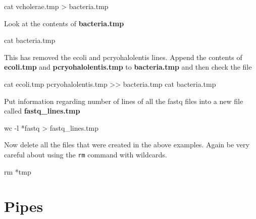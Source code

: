 \documentclass[
  letterpaper,
  DIV=11,
  numbers=noendperiod]{scrreprt}
\newenvironment{Shaded}{\begin{snugshade}}{\end{snugshade}}
\newcommand{\AttributeTok}[1]{\textcolor[rgb]{0.40,0.45,0.13}{#1}}
\newcommand{\FunctionTok}[1]{\textcolor[rgb]{0.28,0.35,0.67}{#1}}
\newcommand{\NormalTok}[1]{\textcolor[rgb]{0.00,0.23,0.31}{#1}}
\newcommand{\OperatorTok}[1]{\textcolor[rgb]{0.37,0.37,0.37}{#1}}
\newcommand{\PreprocessorTok}[1]{\textcolor[rgb]{0.68,0.00,0.00}{#1}}
\begin{document}
\begin{Shaded}
\begin{Highlighting}[]
\FunctionTok{cat}\NormalTok{ vcholerae.tmp }\OperatorTok{\textgreater{}}\NormalTok{ bacteria.tmp}
\end{Highlighting}
\end{Shaded}

Look at the contents of \textbf{bacteria.tmp}

\begin{Shaded}
\begin{Highlighting}[]
\FunctionTok{cat}\NormalTok{ bacteria.tmp}
\end{Highlighting}
\end{Shaded}

This has removed the ecoli and pcryohalolentis lines. Append the
contents of \textbf{ecoli.tmp} and \textbf{pcryohalolentis.tmp} to
\textbf{bacteria.tmp} and then check the file

\begin{Shaded}
\begin{Highlighting}[]
\FunctionTok{cat}\NormalTok{ ecoli.tmp pcryohalolentis.tmp }\OperatorTok{\textgreater{}\textgreater{}}\NormalTok{ bacteria.tmp}
\FunctionTok{cat}\NormalTok{ bacteria.tmp}
\end{Highlighting}
\end{Shaded}

Put information regarding number of lines of all the fastq files into a
new file called \textbf{fastq\_lines.tmp}

\begin{Shaded}
\begin{Highlighting}[]
\FunctionTok{wc} \AttributeTok{{-}l} \PreprocessorTok{*}\NormalTok{fastq }\OperatorTok{\textgreater{}}\NormalTok{ fastq\_lines.tmp}
\end{Highlighting}
\end{Shaded}

Now delete all the files that were created in the above examples. Again
be very careful about using the \texttt{rm} command with wildcards.

\begin{Shaded}
\begin{Highlighting}[]
\FunctionTok{rm} \PreprocessorTok{*}\NormalTok{tmp}
\end{Highlighting}
\end{Shaded}

\hypertarget{pipes}{%
\section{Pipes}\label{pipes}}
\end{document}
